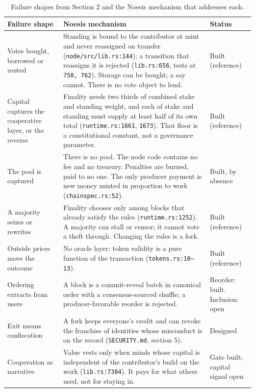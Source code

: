 \documentclass[11pt]{article}
\begin{document}
\begin{table}[h]
\centering
\small
\begin{tabular}{L{3.6cm} L{8.4cm} L{2.6cm}}
\toprule
Failure shape & Noesis mechanism & Status \\
\midrule
Votes bought, borrowed or rented &
Standing is bound to the contributor at mint and never reassigned on transfer (\texttt{node/src/lib.rs:144}); a transition that reassigns it is rejected (\texttt{lib.rs:656}, tests at \texttt{750, 762}). Storage can be bought; a say cannot. There is no vote object to lend. &
Built (reference) \\
\addlinespace
Capital captures the cooperative layer, or the reverse &
Finality needs two thirds of combined stake and standing weight, and each of stake and standing must supply at least half of its own total (\texttt{runtime.rs:1661}, \texttt{1673}). That floor is a constitutional constant, not a governance parameter. &
Built (reference) \\
\addlinespace
The pool is captured &
There is no pool. The node code contains no fee and no treasury. Penalties are burned, paid to no one. The only producer payment is new money minted in proportion to work (\texttt{chainspec.rs:52}). &
Built, by absence \\
\addlinespace
A majority seizes or rewrites &
Finality chooses only among blocks that already satisfy the rules (\texttt{runtime.rs:1252}). A majority can stall or censor; it cannot vote a theft through. Changing the rules is a fork. &
Built (reference) \\
\addlinespace
Outside prices move the outcome &
No oracle layer: token validity is a pure function of the transaction (\texttt{tokens.rs:10--13}). &
Built (reference) \\
\addlinespace
Ordering extracts from users &
A block is a commit-reveal batch in canonical order with a consensus-sourced shuffle; a producer-favorable reorder is rejected. &
Reorder: built. Inclusion: open \\
\addlinespace
Exit means confiscation &
A fork keeps everyone's credit and can revoke the franchise of identities whose misconduct is on the record (\texttt{SECURITY.md}, section 5). &
Designed \\
\addlinespace
Cooperation as narrative &
Value vests only when minds whose capital is independent of the contributor's build on the work (\texttt{lib.rs:7384}). It pays for what others used, not for staying in. &
Gate built; capital signal open \\
\bottomrule
\end{tabular}
\caption{Failure shapes from Section 2 and the Noesis mechanism that addresses each.}
\label{tab:map}
\end{table}
\end{document}
